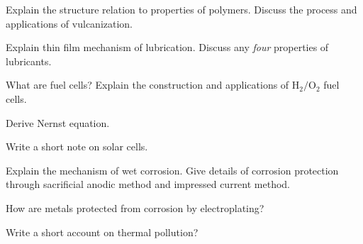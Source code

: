 \newpage \again

\item \iitem Explain the structure relation to properties of polymers. Discuss the process and applications
  of vulcanization.
\Or
\item Explain thin film mechanism of lubrication. Discuss any {\em four} properties of lubricants.
\ene

\item \iitem What are fuel cells? Explain the construction and applications of
  $\text{H}_2/\text{O}_2$ fuel cells.
\Or
\item \iitem Derive Nernst equation. 
\item Write a short note on solar cells. 
\ene
\ene

\item \iitem Explain the mechanism of wet corrosion. Give details of corrosion protection
  through sacrificial anodic method and impressed current method.
\Or
\item \iitem How are metals protected from corrosion by electroplating?  
\item Write a short account on thermal pollution?  
\ene\ene

\markC
\ene
